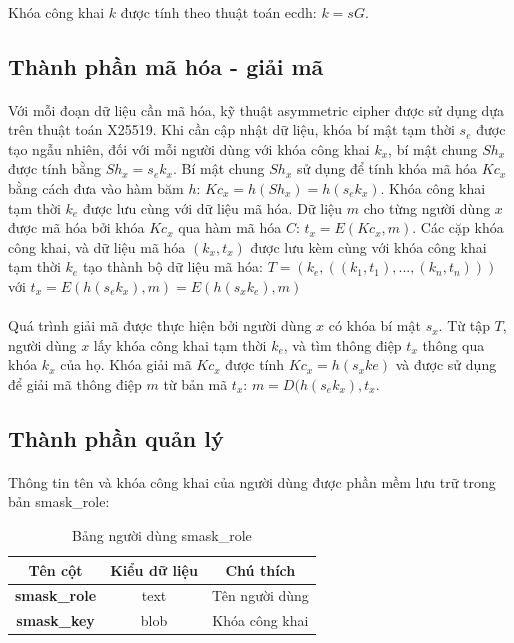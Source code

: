 \paragraph{}
Khóa công khai $k$ được tính theo thuật toán \gls{ecdh}: $k=sG$.

\subsection{Thành phần mã hóa - giải mã}

\paragraph{}
Với mỗi đoạn dữ liệu cần mã hóa, kỹ thuật \gls{asymmetric cipher} được sử dụng dựa trên thuật toán X25519. Khi cần cập nhật dữ liệu, khóa bí mật tạm thời $s_e$ được tạo ngẫu nhiên, đối với mỗi người dùng với khóa công khai $k_x$, bí mật chung $Sh_x$ được tính bằng $Sh_x=s_ek_x$. Bí mật chung $Sh_x$ sử dụng để tính khóa mã hóa $Kc_x$ bằng cách đưa vào hàm băm $h$: $Kc_x=h(Sh_x)=h(s_ek_x)$. Khóa công khai tạm thời $k_e$ được lưu cùng với dữ liệu mã hóa. Dữ liệu $m$ cho từng người dùng $x$ được mã hóa bởi khóa $Kc_x$ qua hàm mã hóa $C$: $t_x = E(Kc_x, m)$. Các cặp khóa công khai, và dữ liệu mã hóa $(k_x, t_x)$ được lưu kèm cùng với khóa công khai tạm thời $k_e$ tạo thành bộ dữ liệu mã hóa:
$T = (k_e, ((k_1, t_1), ..., (k_n, t_n)))$ với $t_x=E(h(s_ek_x), m) = E(h(s_xk_e), m)$

\paragraph{}
Quá trình giải mã được thực hiện bởi người dùng $x$ có khóa bí mật $s_x$. Từ tập $T$, người dùng $x$ lấy khóa công khai tạm thời $k_e$, và tìm thông điệp $t_x$ thông qua khóa $k_x$ của họ. Khóa giải mã $Kc_x$ được tính $Kc_x = h(s_xke)$ và được sử dụng để giải mã thông điệp $m$ từ bản mã $t_x$: $m=D(h(s_ek_x), t_x$.

\subsection{Thành phần quản lý}

\paragraph{}
Thông tin tên và khóa công khai của người dùng được phần mềm lưu trữ trong bản smask\_role:
\begin{table}[H]
	\centering
	\caption{Bảng người dùng smask\_role}
	\begin{tabular}{|c|c|c|}
		\hline
		\textbf{Tên cột} & \textbf{Kiểu dữ liệu} & \textbf{Chú thích} \\
		\hline
		\textbf{smask\_role} & text & Tên người dùng\\
		\hline
		\textbf{smask\_key} & blob & Khóa công khai \\
		\hline
	\end{tabular}
\end{table}

